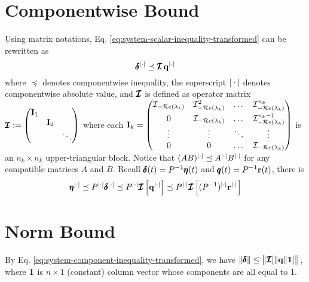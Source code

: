 \section{Componentwise Bound}
    Using matrix notations, Eq. \eqref{eq:system-scalar-inequality-transformed} can be rewritten as
    \begin{equation} \label{eq:system-component-inequality-transformed}
        \pmb{\delta}^{|\cdot|} \preceq \pmb{\mathcal{I}}\,\mathbf{q}^{|\cdot|}
    \end{equation}
    where $\preceq$ denotes componentwise inequality, the superscript $|\cdot|$ denotes componentwise absolute value, and $\pmb{\mathcal{I}}$ is defined as operator matrix $\pmb{\mathcal{I}} := \begin{pmatrix} \mathbf{I}_1 \\ & \mathbf{I}_2 \\ && \ddots \end{pmatrix}$ where each $\mathbf{I}_k = \begin{pmatrix}
        \mathcal{I}_{-\mathcal{R}e\left(\lambda_k\right)} & \mathcal{I}_{-\mathcal{R}e\left(\lambda_k\right)}^2 & \dots &\mathcal{I}_{-\mathcal{R}e\left(\lambda_k\right)}^{n_k} \\[1ex]
        0 & \mathcal{I}_{-\mathcal{R}e\left(\lambda_k\right)} & \dots &\mathcal{I}_{-\mathcal{R}e\left(\lambda_k\right)}^{n_k-1} \\
        \vdots & \vdots & \ddots & \vdots \\
        0 & 0 & \dots & \mathcal{I}_{-\mathcal{R}e\left(\lambda_k\right)}
    \end{pmatrix}$ is an $n_k \times n_k$ upper-triangular block.
    Notice that $(AB)^{|\cdot|} \preceq A^{|\cdot|} B^{|\cdot|}$ for any compatible matrices $A$ and $B$. Recall $\pmb{\delta}(t) = P^{-1}\pmb{\eta}(t)$ and $\pmb{q}(t) = P^{-1} \mathbf{r}(t)$, there is
    \begin{equation}
        \pmb{\eta}^{|\cdot|} 
        \preceq P^{|\cdot|}\pmb{\delta}^{|\cdot|} 
        \preceq P^{|\cdot|} \pmb{\mathcal{I}} \left[\mathbf{q}^{|\cdot|} \right]
        \preceq P^{|\cdot|} \pmb{\mathcal{I}} \left[(P^{-1})^{|\cdot|} \mathbf{r}^{|\cdot|}\right]
    \end{equation}
\section{Norm Bound}
    By Eq. \eqref{eq:system-component-inequality-transformed}, we have $ \|\pmb{\delta}\| \leq \big\|\pmb{\mathcal{I}} [\|\mathbf{q}\| \mathbf{1}]\big\|$, where $\mathbf{1}$ is $n \times 1$ (constant) column vector whose components are all equal to 1.

